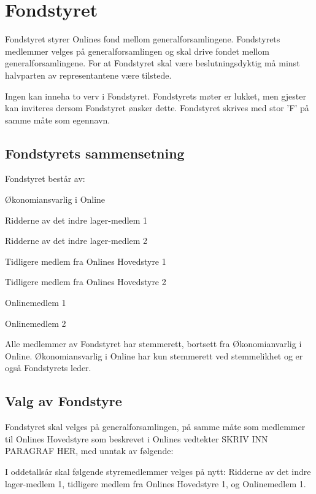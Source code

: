 \chapter{Fondstyret}
\vsapce{23pt}

Fondstyret styrer Onlines fond mellom generalforsamlingene. Fondstyrets medlemmer velges på generalforsamlingen og skal drive fondet mellom generalforsamlingene. For at Fondstyret skal være beslutningsdyktig må minst halvparten av representantene være tilstede.

Ingen kan inneha to verv i Fondstyret. Fondstyrets møter er lukket, men gjester kan inviteres dersom Fondstyret ønsker dette. Fondstyret skrives med stor ’F’ på samme måte som egennavn.

\section{Fondstyrets sammensetning}


Fondstyret består av:

\begin{liste}
  \item Økonomiansvarlig i Online
  \item Ridderne av det indre lager-medlem 1
  \item Ridderne av det indre lager-medlem 2
  \item Tidligere medlem fra Onlines Hovedstyre 1
  \item Tidligere medlem fra Onlines Hovedstyre 2
  \item Onlinemedlem 1
  \item Onlinemedlem 2
\end{liste}

Alle medlemmer av Fondstyret har stemmerett, bortsett fra Økonomianvarlig i Online. Økonomiansvarlig i Online har kun stemmerett ved stemmelikhet og er også Fondstyrets leder.

\section{Valg av Fondstyre}


Fondstyret skal velges på generalforsamlingen, på samme måte som medlemmer til Onlines Hovedstyre som beskrevet i Onlines vedtekter SKRIV INN PARAGRAF HER, med unntak av følgende:

I oddetallsår skal følgende styremedlemmer velges på nytt: Ridderne av det indre lager-medlem 1, tidligere medlem fra Onlines Hovedstyre 1, og Onlinemedlem 1.

